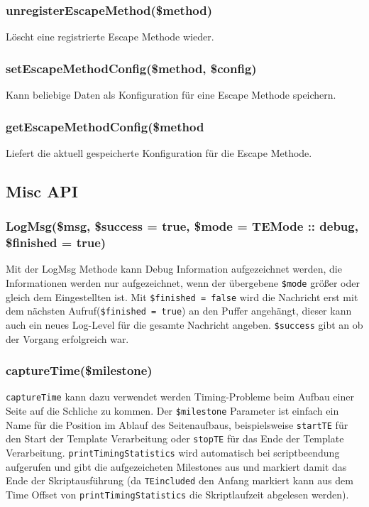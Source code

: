 \documentclass[a4paper,10pt]{article}
\begin{document}
\subsubsection{unregisterEscapeMethod(\$method)}
L\"oscht eine registrierte Escape Methode wieder.

\subsubsection{setEscapeMethodConfig(\$method, \$config)}
Kann beliebige Daten als Konfiguration f\"ur eine Escape Methode speichern.

\subsubsection{getEscapeMethodConfig(\$method}
Liefert die aktuell gespeicherte Konfiguration f\"ur die Escape Methode.

\subsection{Misc API}

\subsubsection{LogMsg(\$msg, \$success = true, \$mode = TEMode :: debug, \$finished = true)}
Mit der LogMsg Methode kann Debug Information aufgezeichnet werden, die Informationen werden nur aufgezeichnet, wenn
der \"ubergebene {\tt \$mode} gr\"o\ss{}er oder gleich dem Eingestellten ist. Mit {\tt \$finished = false} wird die Nachricht
erst mit dem n\"achsten Aufruf({\tt \$finished = true}) an den Puffer angeh\"angt, dieser kann auch ein neues Log-Level f\"ur
die gesamte Nachricht angeben. {\tt \$success} gibt an ob der Vorgang erfolgreich war.

\subsubsection{captureTime(\$milestone)}
{\tt captureTime} kann dazu verwendet werden Timing-Probleme beim Aufbau einer Seite auf die Schliche zu kommen.
Der {\tt \$milestone} Parameter ist einfach ein Name f\"ur die Position im Ablauf des Seitenaufbaus,
beispielsweise {\tt startTE} f\"ur den Start der Template Verarbeitung oder {\tt stopTE} f\"ur das Ende der
Template Verarbeitung. {\tt printTimingStatistics} wird automatisch bei scriptbeendung aufgerufen und gibt die aufgezeicheten
Milestones aus und markiert damit das Ende der Skriptausf\"uhrung (da {\tt TEincluded} den Anfang markiert kann aus
dem Time Offset von {\tt printTimingStatistics} die Skriptlaufzeit abgelesen werden).
\end{document}
